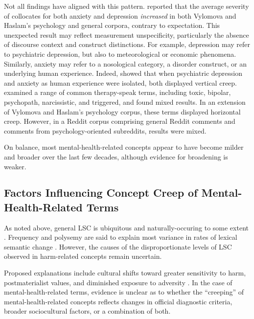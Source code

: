 Not all findings have aligned with this pattern. \citet{xiaoHaveConceptsAnxiety2023} reported that the average severity of collocates for both anxiety and depression \textit{increased} in both Vylomova and Haslam's psychology and general corpora, contrary to expectation. This unexpected result may reflect measurement unspecificity, particularly the absence of discourse context and construct distinctions. For example, depression may refer to psychiatric depression, but also to meteorological or economic phenomena. Similarly, anxiety may refer to a nosological category, a disorder construct, or an underlying human experience. Indeed, \citet{pislRevisitingSemanticSeverity2025} showed that when psychiatric depression and anxiety as human experience were isolated, both displayed vertical creep. \citet{iacobComputationalAnalysisEmergence2026} examined a range of common therapy-speak terms, including toxic, bipolar, psychopath, narcissistic, and triggered, and found mixed results. In an extension of Vylomova and Haslam's psychology corpus, these terms displayed horizontal creep. However, in a Reddit corpus comprising general Reddit comments and comments from psychology-oriented subreddits, results were mixed.

On balance, most mental-health-related concepts appear to have become milder and broader over the last few decades, although evidence for broadening is weaker.

\subsection{Factors Influencing Concept Creep of Mental-Health-Related Terms}

As noted above, general LSC is ubiquitous and naturally-occuring to some extent \citep{campbellHistoricalLinguisticsIntroduction2013}. Frequency and polysemy are said to explain most variance in rates of lexical semantic change \citep{hamiltonDiachronicWordEmbeddings2016}. However, the causes of the disproportionate levels of LSC observed in harm-related concepts remain uncertain.

Proposed explanations include cultural shifts toward greater sensitivity to harm, postmaterialist values, and diminished exposure to adversity \citep{haslamHarmInflationMaking2020,furediCulturalUnderpinningConcept2016}. In the case of mental-health-related terms, evidence is unclear as to whether the ``creeping'' of mental-health-related concepts reflects changes in official diagnostic criteria, broader sociocultural factors, or a combination of both.

